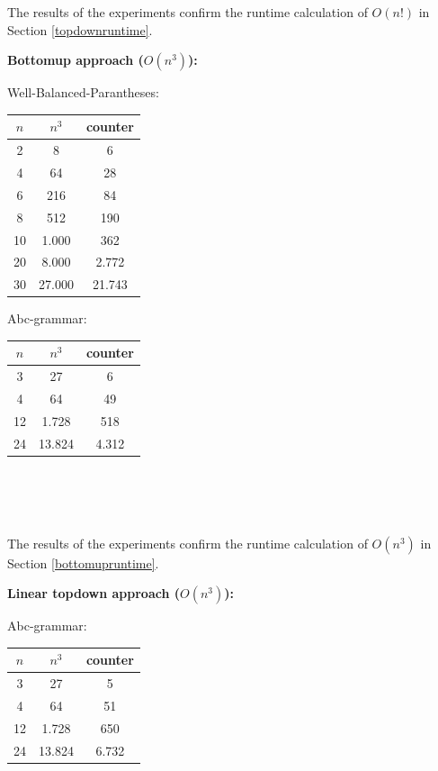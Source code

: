 \documentclass[a4paper, 11pt]{article}
\begin{document}
The results of the experiments confirm the runtime calculation of $O(n!)$ in Section \ref{topdownruntime}.



\newpage
\textbf{Bottomup approach ($O(n^3)$):} \\

\begin{minipage}{0.5\textwidth}

Well-Balanced-Parantheses: \\

\begin{tabular}{|c|c|c|}
\hline
$n$ & $n^3$ & counter \\
\hline
2& 8 & 6\\
4& 64 & 28\\
6& 216 & 84\\
8& 512 & 190 \\
10& 1.000 & 362 \\
20& 8.000 & 2.772 \\
30& 27.000 & 21.743\\
\hline
\end{tabular}

\end{minipage}\begin{minipage}{0.5\textwidth}
    
Abc-grammar: \\

\begin{tabular}{|c|c|c|}
\hline
$n$ & $n^3$ & counter \\
\hline
3& 27 & 6\\
4& 64 & 49 \\
12& 1.728 & 518\\
24& 13.824 & 4.312\\
\hline
\end{tabular}   
\ \\ \ \\ \ \\  
\end{minipage}


The results of the experiments confirm the runtime calculation of $O(n^3)$ in Section \ref{bottomupruntime}.



\textbf{Linear topdown approach ($O(n^3)$):} 
    
Abc-grammar: 

\begin{tabular}{|c|c|c|}
\hline
$n$ & $n^3$ & counter \\
\hline
3& 27 & 5\\
4& 64 & 51 \\
12& 1.728 & 650\\
24& 13.824 & 6.732\\
\hline
\end{tabular}   
\end{document}
